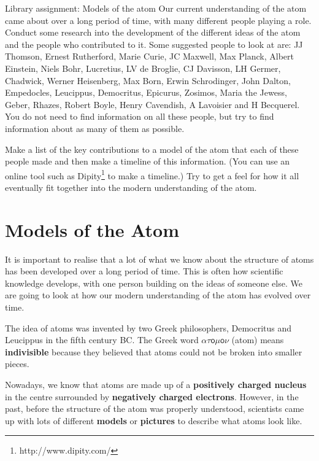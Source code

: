             \begin{project}{Library assignment: Models of the atom}
            \nopagebreak
            \label{m38756*eip-3}
Our current understanding of the atom came about over a long period of time, with many different people playing a role. Conduct some research into the development of the different ideas of the atom and the people who contributed to it. Some suggested people to look at are: JJ Thomson, Ernest Rutherford, Marie Curie, JC Maxwell, Max Planck, Albert Einstein, Niels Bohr, Lucretius, LV de Broglie, CJ Davisson, LH Germer, Chadwick, Werner Heisenberg, Max Born, Erwin Schrodinger, John Dalton, Empedocles, Leucippus, Democritus, Epicurus, Zosimos, Maria the Jewess, Geber, Rhazes, Robert Boyle, Henry Cavendish, A Lavoisier and H Becquerel. You do not need to find information on all these people, but try to find information about as many of them as possible.
\par 
\label{m38756*id7342}Make a list of the key contributions to a model of the atom that each of these people made and then make a timeline of this information. (You can use an online tool such as Dipity\footnote{http://www.dipity.com/}
         to make a timeline.) Try to get a feel for how it all eventually fit together into the modern understanding of the atom. 
\end{project}
\par \label{m38756*cid2}
            \section{Models of the Atom}
            \nopagebreak
      \label{m38756*id254164}It is important to realise that a lot of what we know about the structure of atoms has been developed over a long period of time. This is often how scientific knowledge develops, with one person building on the ideas of someone else. We are going to look at how our modern understanding of the atom has evolved over time.\par 
      \label{m38756*id254508}The idea of atoms was invented by two Greek philosophers, Democritus and Leucippus in the fifth century BC. The Greek word $\mathsf{\alpha \tau o\mu o\nu }$ \hspace{1ex} (atom) means \textbf{indivisible} because they believed that atoms could not be broken into smaller pieces.\par 
      \label{m38756*id254540}Nowadays, we know that atoms are made up of a \textbf{positively charged nucleus} in the centre
surrounded by \textbf{negatively charged electrons}. However, in the past, before the structure of the atom was properly understood, scientists came up with lots of different \textbf{models} or \textbf{pictures} to describe what atoms look like.\par 


